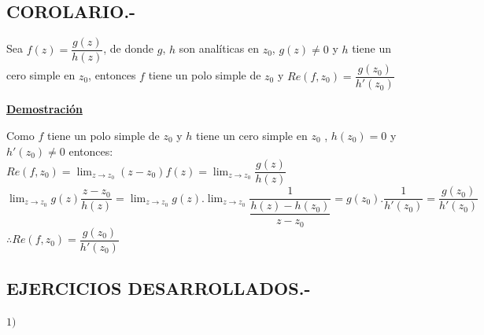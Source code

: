 \documentclass[10pt,a4paper]{article}
\begin{document}
\subsection{COROLARIO.-} 
Sea $f(z) = \dfrac{g(z)}{h(z)}$, de donde $g$, $h$ son analíticas en $z_0$, $g(z) \neq 0$ y $h$ tiene un cero simple en $z_0$, entonces $f$ tiene un polo simple de $z_0$ y $Re(f,z_0) = \dfrac{g(z_0)}{h'(z_0)}$
\begin{center}
\textbf{\underline{Demostración}}
\end{center}
Como $f$ tiene un polo simple de $z_0$ y $h$ tiene un cero simple en $z_0$ , $h(z_0) = 0$ y $h'(z_0) \neq 0$ entonces: \\
$\displaystyle{Re(f,z_0) = \lim_{z \to z_0} (z-z_0) f(z) = \lim_{z \to z_0} \dfrac{g(z)}{h(z)}}$ \\
$\displaystyle{\lim_{z \to z_0} g(z) \dfrac{z-z_0}{h(z)} = \lim_{z \to z_0} g(z). \lim_{z \to z_0} \dfrac{1}{\dfrac{h(z) - h(z_0)}{z-z_0}} = g(z_0) . \dfrac{1}{h'(z_0)} = \dfrac{g(z_0)}{h'(z_0)}}$ \\
$\therefore Re(f,z_0) = \dfrac{g(z_0)}{h'(z_0)}$
\subsection{EJERCICIOS DESARROLLADOS.-}
$1) \; $
\end{document}
